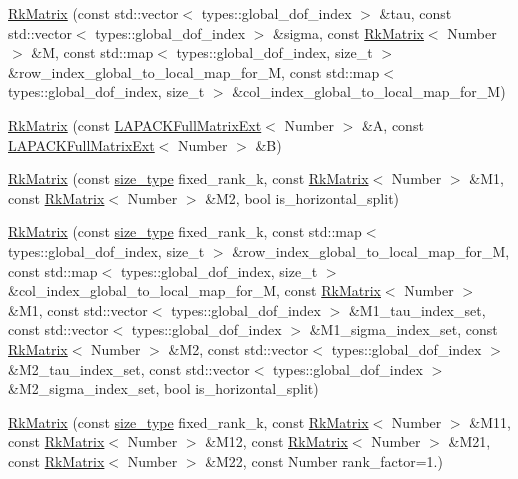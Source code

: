 \begin{DoxyCompactItemize}
\item 
\hyperlink{classRkMatrix_a89ad98e45e6ae6c23a6ffc478c7ebb9f}{Rk\+Matrix} (const std\+::vector$<$ types\+::global\+\_\+dof\+\_\+index $>$ \&tau, const std\+::vector$<$ types\+::global\+\_\+dof\+\_\+index $>$ \&sigma, const \hyperlink{classRkMatrix}{Rk\+Matrix}$<$ Number $>$ \&M, const std\+::map$<$ types\+::global\+\_\+dof\+\_\+index, size\+\_\+t $>$ \&row\+\_\+index\+\_\+global\+\_\+to\+\_\+local\+\_\+map\+\_\+for\+\_\+M, const std\+::map$<$ types\+::global\+\_\+dof\+\_\+index, size\+\_\+t $>$ \&col\+\_\+index\+\_\+global\+\_\+to\+\_\+local\+\_\+map\+\_\+for\+\_\+M)
\item 
\hyperlink{classRkMatrix_a22cbf825bdbff58434ab3d4a6c478b96}{Rk\+Matrix} (const \hyperlink{classLAPACKFullMatrixExt}{L\+A\+P\+A\+C\+K\+Full\+Matrix\+Ext}$<$ Number $>$ \&A, const \hyperlink{classLAPACKFullMatrixExt}{L\+A\+P\+A\+C\+K\+Full\+Matrix\+Ext}$<$ Number $>$ \&B)
\item 
\hyperlink{classRkMatrix_ae15a15d55d04dd677a8dc90dbf789674}{Rk\+Matrix} (const \hyperlink{classRkMatrix_add060bfc3a4cc77f858c3d6dd58cadd5}{size\+\_\+type} fixed\+\_\+rank\+\_\+k, const \hyperlink{classRkMatrix}{Rk\+Matrix}$<$ Number $>$ \&M1, const \hyperlink{classRkMatrix}{Rk\+Matrix}$<$ Number $>$ \&M2, bool is\+\_\+horizontal\+\_\+split)
\item 
\hyperlink{classRkMatrix_a0ef50f2d8d07bcbffa0a6d015dc0d1a4}{Rk\+Matrix} (const \hyperlink{classRkMatrix_add060bfc3a4cc77f858c3d6dd58cadd5}{size\+\_\+type} fixed\+\_\+rank\+\_\+k, const std\+::map$<$ types\+::global\+\_\+dof\+\_\+index, size\+\_\+t $>$ \&row\+\_\+index\+\_\+global\+\_\+to\+\_\+local\+\_\+map\+\_\+for\+\_\+M, const std\+::map$<$ types\+::global\+\_\+dof\+\_\+index, size\+\_\+t $>$ \&col\+\_\+index\+\_\+global\+\_\+to\+\_\+local\+\_\+map\+\_\+for\+\_\+M, const \hyperlink{classRkMatrix}{Rk\+Matrix}$<$ Number $>$ \&M1, const std\+::vector$<$ types\+::global\+\_\+dof\+\_\+index $>$ \&M1\+\_\+tau\+\_\+index\+\_\+set, const std\+::vector$<$ types\+::global\+\_\+dof\+\_\+index $>$ \&M1\+\_\+sigma\+\_\+index\+\_\+set, const \hyperlink{classRkMatrix}{Rk\+Matrix}$<$ Number $>$ \&M2, const std\+::vector$<$ types\+::global\+\_\+dof\+\_\+index $>$ \&M2\+\_\+tau\+\_\+index\+\_\+set, const std\+::vector$<$ types\+::global\+\_\+dof\+\_\+index $>$ \&M2\+\_\+sigma\+\_\+index\+\_\+set, bool is\+\_\+horizontal\+\_\+split)
\item 
\hyperlink{classRkMatrix_ab2826404ecbffa257d56feac015a4c5f}{Rk\+Matrix} (const \hyperlink{classRkMatrix_add060bfc3a4cc77f858c3d6dd58cadd5}{size\+\_\+type} fixed\+\_\+rank\+\_\+k, const \hyperlink{classRkMatrix}{Rk\+Matrix}$<$ Number $>$ \&M11, const \hyperlink{classRkMatrix}{Rk\+Matrix}$<$ Number $>$ \&M12, const \hyperlink{classRkMatrix}{Rk\+Matrix}$<$ Number $>$ \&M21, const \hyperlink{classRkMatrix}{Rk\+Matrix}$<$ Number $>$ \&M22, const Number rank\+\_\+factor=1.)

\end{DoxyCompactItemize}
